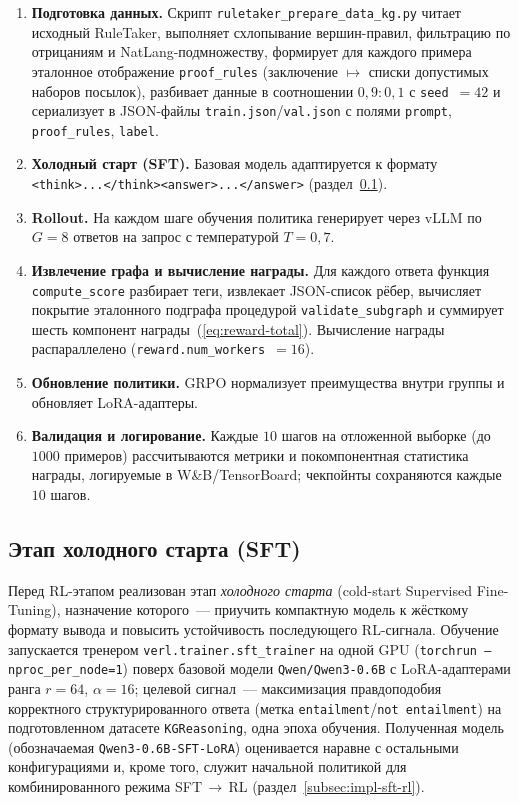 \begin{enumerate}
    \setlength{\itemsep}{\smallskipamount}
    \item \textbf{Подготовка данных.} Скрипт \texttt{ruletaker\_prepare\_data\_kg.py} читает исходный RuleTaker, выполняет схлопывание вершин-правил, фильтрацию по отрицаниям и NatLang-подмножеству, формирует для каждого примера эталонное отображение \texttt{proof\_rules} (заключение $\mapsto$ списки допустимых наборов посылок), разбивает данные в соотношении $0{,}9:0{,}1$ с \texttt{seed}~$=42$ и сериализует в JSON-файлы \texttt{train.json}/\texttt{val.json} с полями \texttt{prompt}, \texttt{proof\_rules}, \texttt{label}.
    \item \textbf{Холодный старт (SFT).} Базовая модель адаптируется к формату \texttt{<think>...</think>\allowbreak<answer>...</answer>} (раздел~\ref{subsec:impl-sft}).
    \item \textbf{Rollout.} На каждом шаге обучения политика генерирует через vLLM по $G=8$ ответов на запрос с температурой $T=0{,}7$.
    \item \textbf{Извлечение графа и вычисление награды.} Для каждого ответа функция \texttt{compute\_score} разбирает теги, извлекает JSON-список рёбер, вычисляет покрытие эталонного подграфа процедурой \texttt{validate\_subgraph} и суммирует шесть компонент награды~(\ref{eq:reward-total}). Вычисление награды распараллелено (\texttt{reward.num\_workers}~$=16$).
    \item \textbf{Обновление политики.} GRPO нормализует преимущества внутри группы и обновляет LoRA-адаптеры.
    \item \textbf{Валидация и логирование.} Каждые $10$ шагов на отложенной выборке (до $1000$ примеров) рассчитываются метрики и покомпонентная статистика награды, логируемые в W\&B/TensorBoard; чекпойнты сохраняются каждые $10$ шагов.
\end{enumerate}

\subsection{Этап холодного старта (SFT)}
\label{subsec:impl-sft}

Перед RL-этапом реализован этап \emph{холодного старта} (cold-start Supervised Fine-Tuning), назначение которого~--- приучить компактную модель к жёсткому формату вывода и повысить устойчивость последующего RL-сигнала. Обучение запускается тренером \texttt{verl.trainer.sft\_trainer} на одной GPU (\texttt{torchrun --nproc\_per\_node=1}) поверх базовой модели \texttt{Qwen/Qwen3-0.6B} с LoRA-адаптерами ранга $r=64$, $\alpha=16$; целевой сигнал~--- максимизация правдоподобия корректного структурированного ответа (метка \texttt{entailment}/\texttt{not entailment}) на подготовленном датасете \texttt{KGReasoning}, одна эпоха обучения. Полученная модель (обозначаемая \texttt{Qwen3-0.6B-SFT-LoRA}) оценивается наравне с остальными конфигурациями и, кроме того, служит начальной политикой для комбинированного режима SFT\,$\to$\,RL (раздел~\ref{subsec:impl-sft-rl}).

